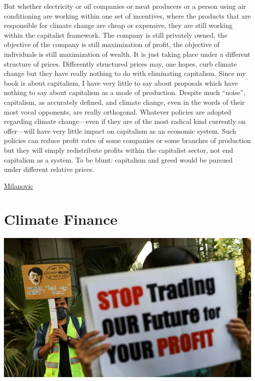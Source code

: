\documentclass[
]{book}
\begin{document}
But whether electricity or oil companies or meat producers or a person using air conditioning are working within one set of incentives, where the products that are responsible for climate change are cheap or expensive, they are still working within the capitalist framework. The company is still privately owned, the objective of the company is still maximization of profit, the objective of individuals is still maximization of wealth. It is just taking place under a different structure of prices. Differently structured prices may, one hopes, curb climate change but they have really nothing to do with eliminating capitalism. Since my book is about capitalism, I have very little to say about proposals which have nothing to say about capitalism as a mode of production. Despite much ``noise'', capitalism, as accurately defined, and climate change, even in the words of their most vocal opponents, are really orthogonal. Whatever policies are adopted regarding climate change---even if they are of the most radical kind currently on offer---will have very little impact on capitalism as an economic system. Such policies can reduce profit rates of some companies or some branches of production but they will simply redistribute profits within the capitalist sector, not end capitalism as a system. To be blunt: capitalism and greed would be pursued under different relative prices.

\href{http://glineq.blogspot.com/2021/05/capital-gains-my-reply-to-alyssa.html}{Milanovic}

\hypertarget{climate-finance}{%
\chapter{Climate Finance}\label{climate-finance}}

\includegraphics{fig/trading_future4profits.png}
\end{document}
